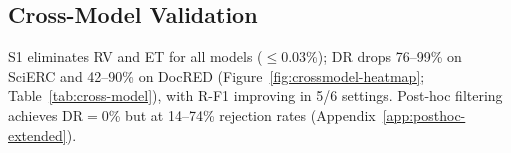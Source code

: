 
\subsection{Cross-Model Validation}
\label{sec:cross-model}


S1 eliminates RV and ET for all models ($\leq$0.03\%); DR drops 76--99\% on SciERC and 42--90\% on DocRED (Figure~\ref{fig:crossmodel-heatmap}; Table~\ref{tab:cross-model}), with R-F1 improving in 5/6 settings.
Post-hoc filtering achieves DR${=}$0\% but at 14--74\% rejection rates (Appendix~\ref{app:posthoc-extended}).

